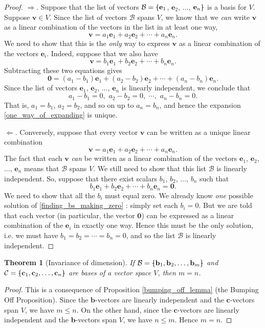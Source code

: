 \documentclass[a4paper,11pt]{book}
\newtheorem{theorem}{Theorem}
\theoremstyle{definition}
\newcommand{\be}{\begin{equation}}
\newcommand{\ee}{\end{equation}}
\newcommand{\ve}[1]{\mathbf{#1}}
\newcommand{\basis}[1]{{\mathcal #1}}
\newcommand{\bmark}{\raisebox{.53ex}{\rule{.2em}{.1ex}}}
\newcommand{\bopen}{{\protect\ooalign{\{\cr\hfil\bmark\hfil\cr}}}
\newcommand{\bclose}{{\protect\ooalign{\}\cr\hfil\bmark\hfil\cr}}}
\begin{document}
\begin{proof} $\Rightarrow$. Suppose that the list of vectors $\basis{B} = \bopen \ve{e}_1$, $\ve{e}_2$, $\ldots$, $\ve{e}_n \bclose$ is a basis for $V$. Suppose $\ve{v} \in V$. Since the list of vectors $\basis{B}$  spans $V$, we know that we {\em can} write $\ve{v}$ as a linear combination of the vectors in the list in at least one way,
\be \label{one_way_of_expanding}
 \ve{v} = a_1 \ve{e}_1 + a_2 \ve{e}_2 + \cdots + a_n \ve{e}_n.
\ee
We need to show that this is the {\em only} way to express $\ve{v}$ as a linear combination of the vectors $\ve{e}_i$. Indeed, suppose that we also have
\be \label{second_way_of_expanding}
 \ve{v} = b_1 \ve{e}_1 + b_2 \ve{e}_2 + \cdots + b_n \ve{e}_n.
\ee
Subtracting these two equations gives
\[
 \ve{0} = (a_1 - b_1) \ve{e}_1 + (a_2 - b_2) \ve{e}_2 + \cdots + (a_n - b_n) \ve{e}_n.
\]
Since the list of vectors $\ve{e}_1$, $\ve{e}_2$, $\ldots$, $\ve{e}_n$ is linearly independent, we conclude that
\[
 a_1 - b_1 = 0, \,\, a_2 - b_2 = 0, \,\, \cdots, \,\, a_n - b_n = 0.
\]
That is, $a_1 = b_1$, $a_2 = b_2$, and so on up to $a_n = b_n$, and hence the expansion \eqref{one_way_of_expanding} is unique. 

$\Leftarrow$. Conversely, suppose that every vector $\ve{v}$ can be written as a unique linear combination
\[
 \ve{v} = a_1 \ve{e}_1 + a_2 \ve{e}_2 + \cdots + a_n \ve{e}_n.
\]
The fact that each $\ve{v}$ {\em can} be written as a linear combination of the vectors $\ve{e}_1$, $\ve{e}_2$, $\ldots$, $\ve{e}_n$ means that $\basis{B}$ spans $V$. We still need to show that this list $\basis{B}$ is linearly independent. So, suppose that there exist scalars $b_1$, $b_2$, $\ldots$, $b_n$ such that
\be \label{finding_bs_making_zero}
 b_1 \ve{e}_1 + b_2 \ve{e}_2 + \cdots + b_n \ve{e}_n = \ve{0}.
\ee
We need to show that all the $b_i$ must equal zero. We already know {\em one} possible solution of \eqref{finding_bs_making_zero} : simply set each $b_i = 0$. But we are told that each vector (in particular, the vector $\ve{0}$) can be expressed as a linear combination of the $\ve{e}_i$ in exactly one way. Hence this must be the only solution, i.e. we must have $b_1 = b_2 = \cdots = b_n = 0$, and so the list $\basis{B}$ is linearly independent. 
\end{proof}

\begin{theorem}[Invariance of dimension] \label{inv_dim} If $\basis{B} = \bopen \ve{b}_1, \ve{b}_2, \ldots, \ve{b}_m \bclose$ and $\basis{C} = \bopen \ve{c}_1, \ve{c}_2, \ldots, \ve{c}_n\bclose$ are bases of a vector space $V$, then $m=n$. 
\end{theorem}
\begin{proof}  This is a consequence of Proposition \ref{bumping_off_lemma} (the Bumping Off Proposition). Since the $\ve{b}$-vectors are linearly independent and the $\ve{c}$-vectors span $V$, we have $m \leq n$. On the other hand, since the $\ve{c}$-vectors are linearly independent and the $\ve{b}$-vectors span $V$, we have $n \leq m$. Hence $m=n$.
\end{proof}
\end{document}
